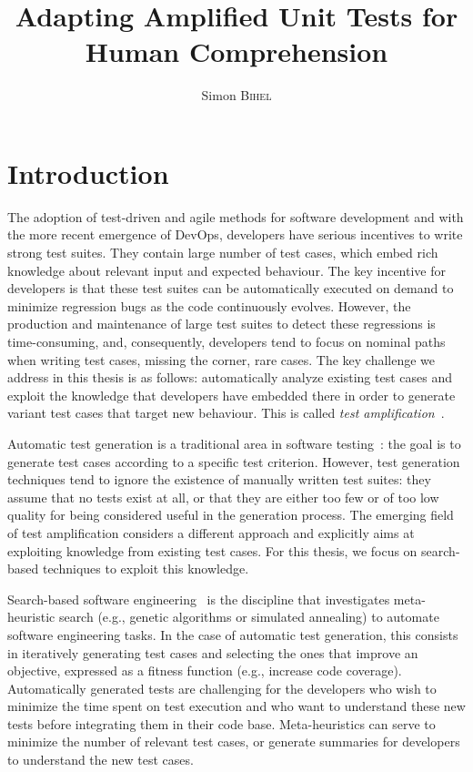\documentclass[a4paper,11pt]{sdm_internship}
\title{Adapting Amplified Unit Tests for Human Comprehension}
\author{Simon \textsc{Bihel}}
\theoremstyle{definition}
\begin{document}
\maketitle

\section*{Introduction}%
\label{sec:intro}%
The adoption of test-driven and agile methods for software development and with the more recent emergence of DevOps, developers have serious incentives to write strong test suites.
They contain large number of test cases, which embed rich knowledge about relevant input and expected behaviour.
The key incentive for developers is that these test suites can be automatically executed on demand to minimize regression bugs as the code continuously evolves.
However, the production and maintenance of large test suites to detect these regressions is time-consuming, and, consequently, developers tend to focus on nominal paths when writing test cases, missing the corner, rare cases.
The key challenge we address in this thesis is as follows: automatically analyze existing test cases and exploit the knowledge that developers have embedded there in order to generate variant test cases that target new behaviour.
This is called \emph{test amplification}~\cite{danglot2017emerging}.

Automatic test generation is a traditional area in software testing~\cite{mcminn2011search}: the goal is to generate test cases according to a specific test criterion.
However, test generation techniques tend to ignore the existence of manually written test suites: they assume that no tests exist at all, or that they are either too few or of too low quality for being considered useful in the generation process.
The emerging field of test amplification considers a different approach and explicitly aims at exploiting knowledge from existing test cases.
For this thesis, we focus on search-based techniques to exploit this knowledge.

Search-based software engineering~\cite{harman2001search} is the discipline that investigates meta-heuristic search (e.g., genetic algorithms or simulated annealing) to automate software engineering tasks.
In the case of automatic test generation, this consists in iteratively generating test cases and selecting the ones that improve an objective, expressed as a fitness function (e.g., increase code coverage).
Automatically generated tests are challenging for the developers who wish to minimize the time spent on test execution and who want to understand these new tests before integrating them in their code base.
Meta-heuristics can serve to minimize the number of relevant test cases, or generate summaries for developers to understand the new test cases.
\end{document}
